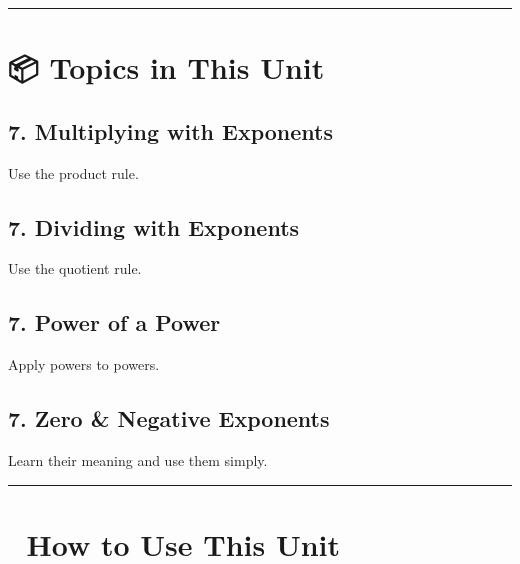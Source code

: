 \documentclass[
  letterpaper,
  DIV=11,
  numbers=noendperiod]{scrreprt}
\begin{document}
\begin{center}\rule{0.5\linewidth}{0.5pt}\end{center}

\section*{📦 Topics in This Unit}\label{topics-in-this-unit-6}


\subsection*{7. Multiplying with
Exponents}\label{multiplying-with-exponents}

Use the product rule.

\subsection*{7. Dividing with Exponents}\label{dividing-with-exponents}

Use the quotient rule.

\subsection*{7. Power of a Power}\label{power-of-a-power}

Apply powers to powers.

\subsection*{7. Zero \& Negative
Exponents}\label{zero-negative-exponents}

Learn their meaning and use them simply.

\begin{center}\rule{0.5\linewidth}{0.5pt}\end{center}

\section*{🧭 How to Use This Unit}\label{how-to-use-this-unit-4}
\end{document}
